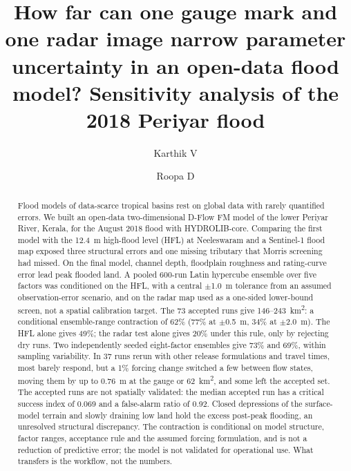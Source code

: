 \documentclass[preprint,12pt,authoryear]{elsarticle}
\newcommand{\kmsq}{km\textsuperscript{2}}
\begin{document}
\begin{frontmatter}

\title{How far can one gauge mark and one radar image narrow parameter uncertainty in an open-data flood model? Sensitivity analysis of the 2018 Periyar flood}

\author[kahe]{Karthik V}
\author[kahe]{Roopa D}

\begin{abstract}
Flood models of data-scarce tropical basins rest on global data with rarely quantified errors. We built an open-data two-dimensional D-Flow FM model of the lower Periyar River, Kerala, for the August 2018 flood with HYDROLIB-core. Comparing the first model with the 12.4~m high-flood level (HFL) at Neeleswaram and a Sentinel-1 flood map exposed three structural errors and one missing tributary that Morris screening had missed. On the final model, channel depth, floodplain roughness and rating-curve error lead peak flooded land. A pooled 600-run Latin hypercube ensemble over five factors was conditioned on the HFL, with a central $\pm$1.0~m tolerance from an assumed observation-error scenario, and on the radar map used as a one-sided lower-bound screen, not a spatial calibration target. The 73 accepted runs give 146--243~\kmsq: a conditional ensemble-range contraction of 62\% (77\% at $\pm$0.5~m, 34\% at $\pm$2.0~m). The HFL alone gives 49\%; the radar test alone gives 20\% under this rule, only by rejecting dry runs. Two independently seeded eight-factor ensembles give 73\% and 69\%, within sampling variability. In 37 runs rerun with other release formulations and travel times, most barely respond, but a 1\% forcing change switched a few between flow states, moving them by up to 0.76~m at the gauge or 62~\kmsq, and some left the accepted set. The accepted runs are not spatially validated: the median accepted run has a critical success index of 0.069 and a false-alarm ratio of 0.92. Closed depressions of the surface-model terrain and slowly draining low land hold the excess post-peak flooding, an unresolved structural discrepancy. The contraction is conditional on model structure, factor ranges, acceptance rule and the assumed forcing formulation, and is not a reduction of predictive error; the model is not validated for operational use. What transfers is the workflow, not the numbers.
\end{abstract}


\end{frontmatter}
\end{document}
